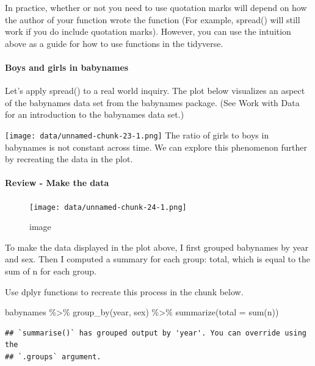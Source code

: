 \documentclass[
]{article}
\newenvironment{Shaded}{\begin{snugshade}}{\end{snugshade}}
\newcommand{\AttributeTok}[1]{\textcolor[rgb]{0.77,0.63,0.00}{#1}}
\newcommand{\FunctionTok}[1]{\textcolor[rgb]{0.00,0.00,0.00}{#1}}
\newcommand{\NormalTok}[1]{#1}
\newcommand{\SpecialCharTok}[1]{\textcolor[rgb]{0.00,0.00,0.00}{#1}}
\begin{document}
In practice, whether or not you need to use quotation marks will depend
on how the author of your function wrote the function (For example,
spread() will still work if you do include quotation marks). However,
you can use the intuition above as a guide for how to use functions in
the tidyverse.

\hypertarget{boys-and-girls-in-babynames}{%
\paragraph{Boys and girls in
babynames}\label{boys-and-girls-in-babynames}}

Let's apply spread() to a real world inquiry. The plot below visualizes
an aspect of the babynames data set from the babynames package. (See
Work with Data for an introduction to the babynames data set.)

\texttt{[image: data/unnamed-chunk-23-1.png]} The ratio of girls to boys
in babynames is not constant across time. We can explore this phenomenon
further by recreating the data in the plot.

\hypertarget{review---make-the-data}{%
\paragraph{Review - Make the data}\label{review---make-the-data}}

\begin{figure}
\centering
\texttt{[image: data/unnamed-chunk-24-1.png]}
\caption{image}
\end{figure}

To make the data displayed in the plot above, I first grouped babynames
by year and sex. Then I computed a summary for each group: total, which
is equal to the sum of n for each group.

Use dplyr functions to recreate this process in the chunk below.

\begin{Shaded}
\begin{Highlighting}[]
\NormalTok{babynames }\SpecialCharTok{\%\textgreater{}\%} 
  \FunctionTok{group\_by}\NormalTok{(year, sex) }\SpecialCharTok{\%\textgreater{}\%} 
  \FunctionTok{summarize}\NormalTok{(}\AttributeTok{total =} \FunctionTok{sum}\NormalTok{(n))}
\end{Highlighting}
\end{Shaded}

\begin{verbatim}
## `summarise()` has grouped output by 'year'. You can override using the
## `.groups` argument.
\end{verbatim}
\end{document}
